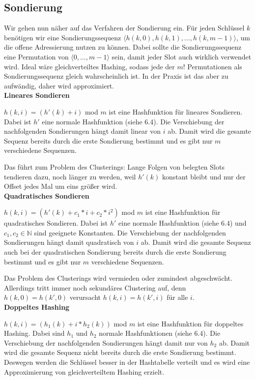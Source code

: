 \documentclass[12pt]{article}
\begin{document}
\subsection{Sondierung}

Wir gehen nun näher auf das Verfahren der Sondierung ein. Für jeden Schlüssel $k$ benötigen wir eine Sondierungssequenz $\langle{}h(k,0), h(k,1), ..., h(k, m-1)\rangle$, um die offene Adressierung nutzen zu können. Dabei sollte die Sondierungssequenz eine Permutation von $\langle{}0, ..., m-1\rangle$ sein, damit jeder Slot auch wirklich verwendet wird. Ideal wäre gleichverteiltes Hashing, sodass jede der $m!$ Permutationen als Sondierungssequenz gleich wahrscheinlich ist. In der Praxis ist das aber zu aufwändig, daher wird approximiert.\\

\textbf{Lineares Sondieren}

$h(k, i) = (h'(k) + i)$ mod $m$ ist eine Hashfunktion für lineares Sondieren. Dabei ist $h'$ eine normale Hashfunktion (siehe 6.4). Die Verschiebung der nachfolgenden Sondierungen hängt damit linear von $i$ ab. Damit wird die gesamte Sequenz bereits durch die erste Sondierung bestimmt und es gibt nur $m$ verschiedene Sequenzen.

Das führt zum Problem des Clusterings: Lange Folgen von belegten Slots tendieren dazu, noch länger zu werden, weil $h'(k)$ konstant bleibt und nur der Offset jedes Mal um eins größer wird.\\

\textbf{Quadratisches Sondieren}

$h(k, i) = (h'(k) + c_1 * i + c_2 * i^2)$ mod $m$ ist eine Hashfunktion für quadratisches Sondieren. Dabei ist $h'$ eine normale Hashfunktion (siehe 6.4) und $c_1, c_2 \in \mathbb{N}$ sind geeignete Konstanten. Die Verschiebung der nachfolgenden Sondierungen hängt damit quadratisch von $i$ ab. Damit wird die gesamte Sequenz auch bei der quadratischen Sondierung bereits durch die erste Sondierung bestimmt und es gibt nur $m$ verschiedene Sequenzen.

Das Problem des Clusterings wird vermieden oder zumindest abgeschwächt. Allerdings tritt immer noch sekundäres Clustering auf, denn $h(k,0) = h(k',0)$ verursacht $h(k,i) = h(k',i)$ für alle $i$.\\

\textbf{Doppeltes Hashing}

$h(k, i) = (h_1(k) + i * h_2(k))$ mod $m$ ist eine Hashfunktion für doppeltes Hashing. Dabei sind $h_1$ und $h_2$ normale Hashfunktionen (siehe 6.4). Die Verschiebung der nachfolgenden Sondierungen hängt damit nur von $h_2$ ab. Damit wird die gesamte Sequenz nicht bereits durch die erste Sondierung bestimmt. Deswegen werden die Schlüssel besser in der Hashtabelle verteilt und es wird eine Approximierung von gleichverteiltem Hashing erzielt.
\end{document}
